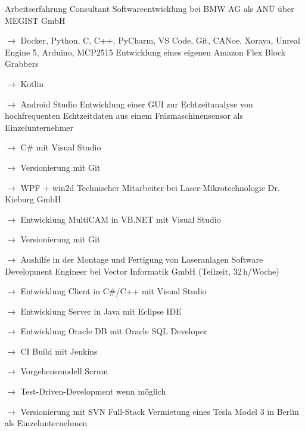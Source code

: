 \begin{rubric}{\textcolor{black!20!blue!100}{Arbeitserfahrung}}%
		\entry*[05/2023 --- 02/2024]
			Consultant Softwareentwicklung bei BMW AG als ANÜ über \glqq MEGIST GmbH\grqq
			
			\setlength{\hangindent}{\widthof{$\rightarrow$ }}
			$\rightarrow$ Docker, Python, C, C++, PyCharm, VS Code, Git, CANoe, Xoraya, Unreal Engine 5, Arduino, MCP2515
		\entry*[2021 --- 2022]
			Entwicklung eines eigenen Amazon Flex Block Grabbers
			
			\setlength{\hangindent}{\widthof{$\rightarrow$ }}
			$\rightarrow$ Kotlin
			
			$\rightarrow$ Android Studio
		\entry*[03/2020 --- 05/2020]
			Entwicklung einer GUI zur Echtzeitanalyse von hochfrequenten Echtzeitdaten aus einem Fräsmaschinensensor als Einzelunternehmer
			
			\setlength{\hangindent}{\widthof{$\rightarrow$ }}
			$\rightarrow$ C\# mit Visual Studio
			
			$\rightarrow$ Versionierung mit Git
			
			$\rightarrow$ WPF + win2d
		\entry*[04/07/2019 --- 30/09/2020]
			Technischer Mitarbeiter bei \glqq Laser-Mikrotechnologie Dr. Kieburg GmbH\grqq
			
			\setlength{\hangindent}{\widthof{$\rightarrow$ }}
			$\rightarrow$ Entwicklung MultiCAM in VB.NET mit Visual Studio
			
			$\rightarrow$ Versionierung mit Git
			
			$\rightarrow$ Aushilfe in der Montage und Fertigung von Laseranlagen
		\entry*[11/2017 --- 03/2019]
			Software Development Engineer bei Vector Informatik GmbH (Teilzeit, 32\,h/Woche)
			
			\setlength{\hangindent}{\widthof{$\rightarrow$ }}
			$\rightarrow$ Entwicklung Client in C\#/C++ mit Visual Studio
			
			$\rightarrow$ Entwicklung Server in Java mit Eclipse IDE
			
			$\rightarrow$ Entwicklung Oracle DB mit Oracle SQL Developer
			
			$\rightarrow$ CI Build mit Jenkins
			
			$\rightarrow$ Vorgehensmodell Scrum
			
			$\rightarrow$ Test-Driven-Development wenn möglich
			
			$\rightarrow$ Versionierung mit SVN
		\entry*[10/2019 --- 03/2023]
			Full-Stack Vermietung eines Tesla Model 3 in Berlin als Einzelunternehmen
			

\end{rubric}
